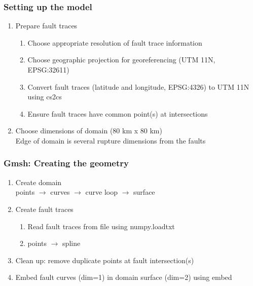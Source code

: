 \documentclass[aspectratio=169]{beamer}
\begin{document}
\begin{frame}
  \frametitle{Setting up the model}
  \summary{}
  
  \begin{enumerate}
  \item Prepare fault traces
    \begin{enumerate}
    \item Choose appropriate resolution of fault trace information
    \item Choose geographic projection for georeferencing (UTM 11N, {\ttfamily EPSG:32611})
    \item Convert fault traces (latitude and longitude, {\ttfamily EPSG:4326}) to UTM 11N using {\ttfamily cs2cs}
    \item Ensure fault traces have common point(s) at intersections
    \end{enumerate}\pause
  \item Choose dimensions of domain (80 km x 80 km)\\
    Edge of domain is several rupture dimensions from the faults
  \end{enumerate}
  
\end{frame}


\begin{frame}
  \frametitle{Gmsh: Creating the geometry}
  \summary{}
  
  \begin{enumerate}
  \item Create domain\\
    points $\rightarrow$ curves $\rightarrow$ curve loop $\rightarrow$ surface\pause
  \item Create fault traces
    \begin{enumerate}
    \item Read fault traces from file using {\ttfamily numpy.loadtxt}
    \item points $\rightarrow$ spline
    \end{enumerate}\pause
  \item Clean up: remove duplicate points at fault intersection(s)\pause
  \item Embed fault curves (dim=1) in domain surface (dim=2) using {\ttfamily embed}
  \end{enumerate}
  
\end{frame}
\end{document}
